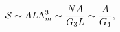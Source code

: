 \begin{equation}
{\cal{S}} \sim A L \Lambda_m^3 \sim \frac{N A}{G_3 L} 
\sim \frac{A}{G_4},
\end{equation}

